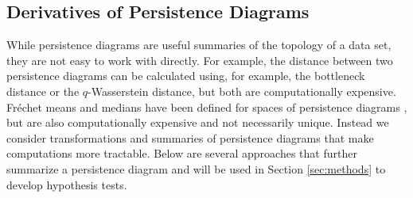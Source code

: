 \documentclass[12pt]{article}
\newcommand{\brittany}[1]{{\color{cyan} Brittany says: #1}}
\newcommand{\figref}[1]{Figure~\ref{#1}}
\def\R{{\mathbb R}}
\begin{document}
%

\subsection{Derivatives of Persistence Diagrams} \label{sec:derivatives}
While persistence diagrams are useful summaries of the topology of a data set, they are not easy to work with directly.
For example, the distance between two persistence diagrams can be calculated using, for example,  the bottleneck distance or the $q$-Wasserstein distance, but both are computationally expensive.  
Fr\'echet means and medians have been defined for spaces of persistence diagrams \citep{Turner:2014kq}, but are also computationally expensive and not necessarily unique.  Instead we consider transformations and summaries of persistence diagrams that make computations more tractable.
Below are several approaches that further summarize a persistence diagram and will be used in Section \ref{sec:methods} to develop hypothesis tests.
\end{document}
